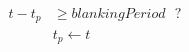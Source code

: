 \documentclass[10pt]{article}
\begin{document}
\begin{align*}t-t_{p} & \geq blankingPeriod\text{ }? \\
&t_p \leftarrow t\end{align*}
\end{document}
